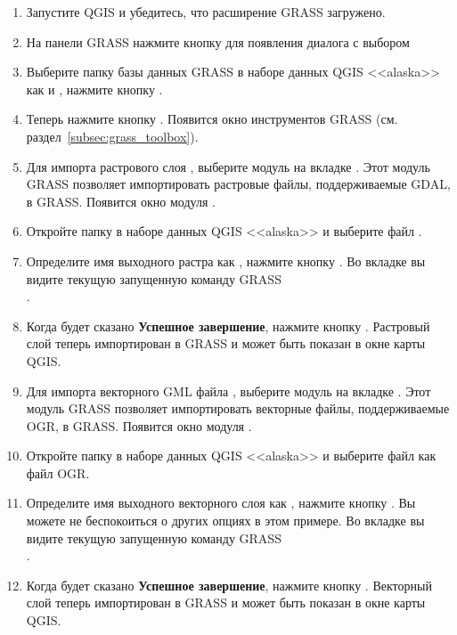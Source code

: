 \begin{enumerate}
  \item Запустите QGIS и убедитесь, что расширение GRASS загружено.
  \item На панели GRASS нажмите кнопку 
  для появления диалога с выбором 
  \item Выберите папку базы данных GRASS  в наборе
  данных QGIS <<alaska>> как  и 
  , нажмите кнопку .
  \item Теперь нажмите кнопку .
  Появится окно инструментов GRASS (см. раздел~\ref{subsec:grass_toolbox}).
  \item Для импорта растрового слоя , выберите
  модуль  на вкладке . Этот
  модуль GRASS позволяет импортировать растровые файлы, поддерживаемые
  GDAL, в  GRASS. Появится окно модуля .
  \item Откройте папку  в наборе данных QGIS <<alaska>>
  и выберите файл .
  \item Определите имя выходного растра как ,
  нажмите кнопку . Во вкладке  вы видите
  текущую запущенную команду GRASS \\
  .
  \item Когда будет сказано \textbf{Успешное завершение}, нажмите кнопку
  . Растровый слой 
  теперь импортирован в GRASS и может быть показан в окне карты QGIS.
  \item Для импорта векторного GML файла , выберите
  модуль  на вкладке . Этот модуль
  GRASS позволяет импортировать векторные файлы, поддерживаемые OGR, в
   GRASS. Появится окно модуля .
  \item Откройте папку  в наборе данных QGIS <<alaska>>
  и выберите файл  как файл OGR.
  \item Определите имя выходного векторного слоя как ,
  нажмите кнопку . Вы можете не беспокоиться о других
  опциях в этом примере. Во вкладке  вы видите текущую
  запущенную команду GRASS \\
  .
  \item Когда будет сказано \textbf{Успешное завершение}, нажмите кнопку
  . Векторный слой  теперь
  импортирован в GRASS и может быть показан в окне карты QGIS.
\end{enumerate}


